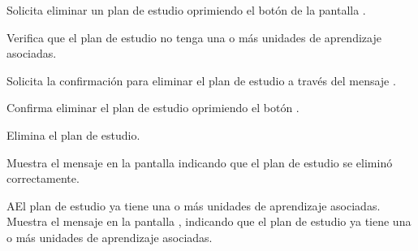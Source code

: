 \begin{UCtrayectoria}
	\UCpaso [\UCactor] Solicita eliminar un plan de estudio oprimiendo el botón  de la pantalla .
	
	\UCpaso [\UCsist] Verifica que el plan de estudio no tenga una o más unidades de aprendizaje asociadas. 
	
	\UCpaso [\UCsist] Solicita la confirmación para eliminar el plan de estudio a través del mensaje .
	
	\UCpaso [\UCactor] Confirma eliminar el plan de estudio oprimiendo el botón .
	
	\UCpaso [\UCsist] Elimina el plan de estudio.
	
	\UCpaso [\UCsist] Muestra el mensaje  en la pantalla  indicando que el plan de estudio se eliminó correctamente.	
	
\end{UCtrayectoria}

\begin{UCtrayectoriaA}{A}{El plan de estudio ya tiene una o más unidades de aprendizaje asociadas.}
	\UCpaso [\UCsist] Muestra el mensaje  en la pantalla , indicando que el plan de estudio ya tiene una o más unidades de aprendizaje asociadas. 
\end{UCtrayectoriaA}
